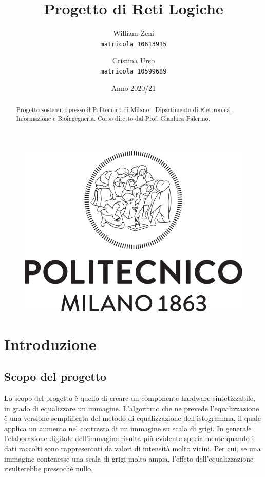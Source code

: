 \documentclass[11pt, a4paper]{article}
\title{Progetto di Reti Logiche}
\author{
  William Zeni\\
  \texttt{matricola 10613915}
  \and
  Cristina Urso\\
  \texttt{matricola 10599689}
}
\date{Anno 2020/21}
\begin{document}
\begin{figure}[t]
  \centering
  \vspace{3cm}
  \includegraphics[scale=0.4]{Logo_Politecnico_Milano.png}
  \vspace{3cm}
\end{figure}

\maketitle
\renewcommand{\abstractname}{ }
\begin{abstract}
  \centering
  Progetto sostenuto presso il Politecnico di Milano - Dipartimento di Elettronica, Informazione e Bioingegneria. Corso diretto dal Prof. Gianluca Palermo.
\end{abstract}

\thispagestyle{empty}
\pagebreak
\tableofcontents
\thispagestyle{empty}
\pagebreak
{}


\section{Introduzione}
\subsection{Scopo del progetto}
Lo scopo del progetto è quello di creare un componente hardware sintetizzabile, in grado di equalizzare un immagine. L'algoritmo che ne prevede l'equalizzazione è una versione semplificata del metodo di equalizzazione dell'istogramma, il quale applica un aumento nel contrasto di un immagine su scala di grigi. In generale l'elaborazione digitale dell'immagine risulta più evidente specialmente quando i dati raccolti sono rappresentati da valori di intensità molto vicini. Per cui, se una immagine contenesse una scala di grigi molto ampia, l'effeto dell'equalizzazione risulterebbe pressochè nullo.
\end{document}
